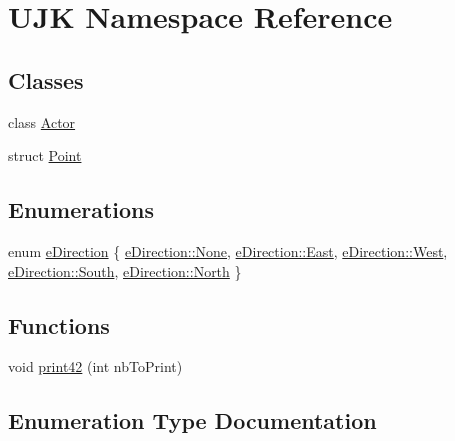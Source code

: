 \hypertarget{namespace_u_j_k}{}\section{U\+JK Namespace Reference}
\label{namespace_u_j_k}
\subsection*{Classes}
\begin{DoxyCompactItemize}
\item 
class \mbox{\hyperlink{class_u_j_k_1_1_actor}{Actor}}
\item 
struct \mbox{\hyperlink{struct_u_j_k_1_1_point}{Point}}
\end{DoxyCompactItemize}
\subsection*{Enumerations}
\begin{DoxyCompactItemize}
\item 
enum \mbox{\hyperlink{namespace_u_j_k_a7846eb5bb02d838fa7687ac386465291}{e\+Direction}} \{ \newline
\mbox{\hyperlink{namespace_u_j_k_a7846eb5bb02d838fa7687ac386465291a6adf97f83acf6453d4a6a4b1070f3754}{e\+Direction\+::\+None}}, 
\mbox{\hyperlink{namespace_u_j_k_a7846eb5bb02d838fa7687ac386465291aa99dc62d017d04cf67266593f9c3761e}{e\+Direction\+::\+East}}, 
\mbox{\hyperlink{namespace_u_j_k_a7846eb5bb02d838fa7687ac386465291abf495fc048d8d44b7f32536df5cf3930}{e\+Direction\+::\+West}}, 
\mbox{\hyperlink{namespace_u_j_k_a7846eb5bb02d838fa7687ac386465291a263d7b2cf53802c9ed127b718c0bf9fd}{e\+Direction\+::\+South}}, 
\newline
\mbox{\hyperlink{namespace_u_j_k_a7846eb5bb02d838fa7687ac386465291a601560b94fbb188919dd1d36c8ab70a4}{e\+Direction\+::\+North}}
 \}
\end{DoxyCompactItemize}
\subsection*{Functions}
\begin{DoxyCompactItemize}
\item 
void \mbox{\hyperlink{namespace_u_j_k_a089edc814258b025e987f700d263695d}{print42}} (int nb\+To\+Print)
\end{DoxyCompactItemize}


\subsection{Enumeration Type Documentation}
\mbox{\label{namespace_u_j_k_a7846eb5bb02d838fa7687ac386465291}} 
